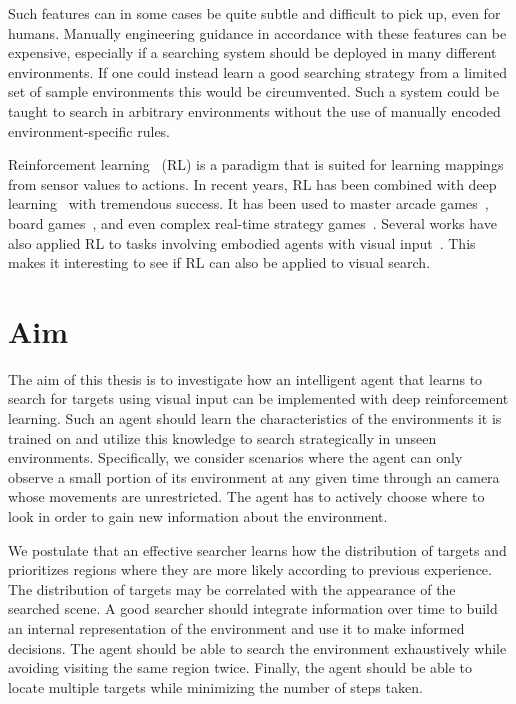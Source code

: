 Such features can in some cases be quite subtle and difficult to pick up, even for humans.
Manually engineering guidance in accordance with these features can be expensive,
especially if a searching system should be deployed in many different environments.
If one could instead learn a good searching strategy from a limited set of sample environments this would be circumvented.
Such a system could be taught to search in arbitrary environments without the use of manually encoded environment-specific rules.

Reinforcement learning~\cite{sutton_reinforcement_2018} (RL) is a paradigm that is suited for learning mappings from sensor values to actions.
In recent years, RL has been combined with deep learning~\cite{goodfellow_deep_2016} with tremendous success.
It has been used to master arcade games~\cite{mnih_human-level_2015}, board games~\cite{silver_mastering_2016}, and even complex real-time strategy games~\cite{vinyals_grandmaster_2019}.
Several works have also applied RL to tasks involving embodied agents with visual input~\cite{minut_reinforcement_2001,mnih_recurrent_2014,zhu_target-driven_2017,mirowski_learning_2017}.
This makes it interesting to see if RL can also be applied to visual search.

\section{Aim}
\label{sec:aim}

The aim of this thesis is to investigate how an intelligent agent that learns to search for targets using visual input can be implemented with deep reinforcement learning.
Such an agent should learn the characteristics of the environments it is trained on and utilize this knowledge to search strategically in unseen environments.
Specifically, we consider scenarios where the agent can only observe a small portion of its environment at any given time through an camera whose movements are unrestricted.
The agent has to actively choose where to look in order to gain new information about the environment.

We postulate that an effective searcher learns how the distribution of targets and prioritizes regions where they are more likely according to previous experience.
The distribution of targets may be correlated with the appearance of the searched scene.
A good searcher should integrate information over time to build an internal representation of the environment and use it to make informed decisions.
The agent should be able to search the environment exhaustively while avoiding visiting the same region twice.
Finally, the agent should be able to locate multiple targets while minimizing the number of steps taken.

